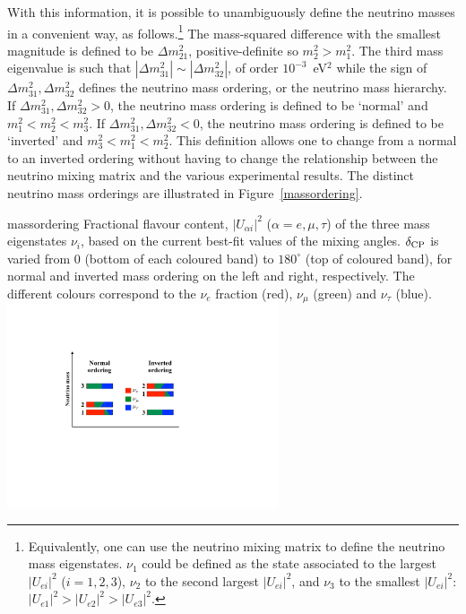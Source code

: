 With this information, it is possible to unambiguously define the neutrino masses in a convenient way, as follows.\footnote{Equivalently, one can use the neutrino mixing matrix to define the neutrino mass eigenstates. $\nu_1$ could be defined as the state associated to the largest $|U_{ei}|^2$ ($i=1,2,3$), $\nu_2$ to the second largest $|U_{ei}|^2$, and $\nu_3$ to the smallest $|U_{ei}|^2$: $|U_{e1}|^2>|U_{e2}|^2>|U_{e3}|^2$.} The mass-squared difference with the smallest magnitude is defined to be $\Delta m^2_{21}$, positive-definite so $m_2^2>m_1^2$. The third mass eigenvalue is such that $|\Delta m^2_{31}|\sim|\Delta m^2_{32}|$, of order $10^{-3}$~eV$^2$ while the sign of  $\Delta m^2_{31}, \Delta m^2_{32}$ defines the neutrino mass ordering, or the neutrino mass hierarchy. If $\Delta m^2_{31}, \Delta m^2_{32}>0$, the neutrino mass ordering is defined to be `normal' and $m_1^2<m_2^2<m_3^2$. If $\Delta m^2_{31}, \Delta m^2_{32}<0$, the neutrino mass ordering is defined to be `inverted' and $m_3^2<m_1^2<m_2^2$. This definition allows one to change from a normal to an inverted ordering without having to change the relationship between the neutrino mixing matrix and the various experimental results. The distinct neutrino mass orderings are illustrated in Figure~\ref{massordering}.
\begin{dunefigure}{massordering}{
   Fractional flavour content, $|U_{\alpha i}|^2$ ($\alpha = e, \mu, \tau$) of the three mass eigenstates $\nu_i$, based on the current best-fit values of the mixing angles. $\delta_{\rm CP}$ is varied from 0 (bottom of each coloured band) to $180^\circ$ (top of coloured band), for normal and inverted mass ordering on the left and right, respectively. The different colours correspond to the $\nu_e$ fraction (red), $\nu_\mu$ (green) and $\nu_\tau$ (blue). 
}
  \includegraphics[width=0.6\textwidth]{graphics/PastedGraphic-1.pdf}
\end{dunefigure}

